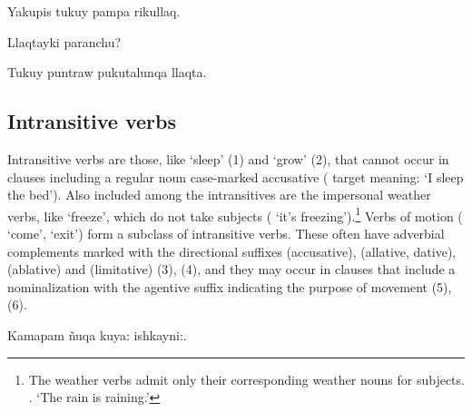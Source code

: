 %
{Yakupis tukuy pampa rikullaq.}%
{}%
{}{}%

%
{\textquestiondown{}Llaqtayki paranchu?}%
{}%
{}{}%

%
{Tukuy puntraw pukutalunqa llaqta.}%
{}%
{}{}%

\subsection{Intransitive verbs}\label{subsec:intransitiveverbs}
Intransitive verbs are those, like  `sleep' (1) and  `grow' (2), that cannot occur in clauses including a regular noun case-marked accusative (  target meaning: `I sleep the bed'). Also included among the intransitives are the impersonal weather verbs, like  `freeze', which do not take subjects ( `it's freezing').\footnote{The weather verbs admit only their corresponding weather nouns for subjects. . `The rain is raining.'} Verbs of motion ( `come',  `exit') form a subclass of intransitive verbs. These often have adverbial complements marked with the directional suffixes  (accusative),  (allative, dative),  (ablative) and  (limitative) (3), (4), and they may occur in clauses that include a nominalization with the agentive suffix  indicating the purpose of movement (5), (6).

%
{Kamapam \~nuqa kuya: ishkayni:.}%
{}%
{}{}%

